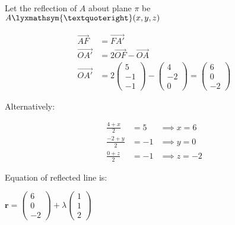 \begin{enumerate}
Let the reflection of $A$ about plane $\pi$ be $A\lyxmathsym{\textquoteright}(x,y,z)$ 

\begin{align*}
\overrightarrow{AF} & =\overrightarrow{FA'}\\
\overrightarrow{OA'} & =2\overrightarrow{OF}-\overrightarrow{OA}\\
\overrightarrow{OA'} & =2\left(\begin{matrix}5\\
-1\\
-1
\end{matrix}\right)-\left(\begin{matrix}4\\
-2\\
0
\end{matrix}\right)=\left(\begin{matrix}6\\
0\\
-2
\end{matrix}\right)
\end{align*}
 

Alternatively:

\begin{align*}
\frac{4+x}{2} & =5 & \implies x=6\\
\frac{-2+y}{2} & =-1 & \implies y=0\\
\frac{0+z}{2} & =-1 & \implies z=-2
\end{align*}

Equation of reflected line is: 

$\mathbf{r}=\left(\begin{matrix}6\\
0\\
-2
\end{matrix}\right)+\lambda\left(\begin{matrix}1\\
1\\
2
\end{matrix}\right)$
\end{enumerate}